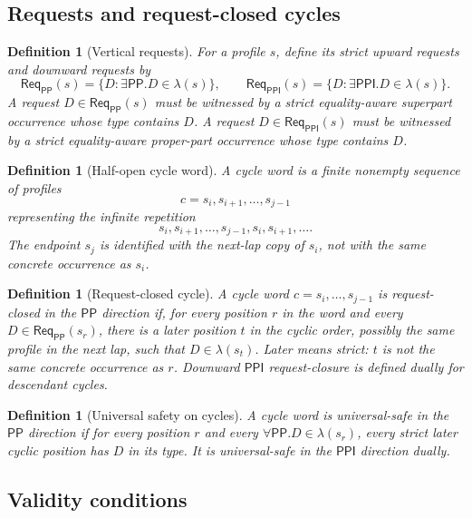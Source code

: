 \documentclass[11pt]{article}
\newtheorem{definition}[theorem]{Definition}
\newcommand{\PP}{\mathsf{PP}}
\newcommand{\PPI}{\mathsf{PPI}}
\newcommand{\Req}{\mathsf{Req}}
\begin{document}
\subsection{Requests and request-closed cycles}

\begin{definition}[Vertical requests]\label{def:requests}
For a profile $s$, define its strict upward requests and downward requests by
\[
  \Req_\PP(s)=\{D: \exists\PP.D\in\lambda(s)\},
  \qquad
  \Req_\PPI(s)=\{D: \exists\PPI.D\in\lambda(s)\}.
\]
A request $D\in\Req_\PP(s)$ must be witnessed by a strict equality-aware superpart occurrence whose type contains $D$.  A request $D\in\Req_\PPI(s)$ must be witnessed by a strict equality-aware proper-part occurrence whose type contains $D$.
\end{definition}

\begin{definition}[Half-open cycle word]\label{def:cycle-word}
A cycle word is a finite nonempty sequence of profiles
\[
   c=s_i,s_{i+1},\ldots,s_{j-1}
\]
representing the infinite repetition
\[
   s_i,s_{i+1},\ldots,s_{j-1},s_i,s_{i+1},\ldots.
\]
The endpoint $s_j$ is identified with the next-lap copy of $s_i$, not with the same concrete occurrence as $s_i$.
\end{definition}

\begin{definition}[Request-closed cycle]\label{def:request-closed-cycle}
A cycle word $c=s_i,\ldots,s_{j-1}$ is request-closed in the $\PP$ direction if, for every position $r$ in the word and every $D\in\Req_\PP(s_r)$, there is a later position $t$ in the cyclic order, possibly the same profile in the next lap, such that $D\in\lambda(s_t)$.  Later means strict: $t$ is not the same concrete occurrence as $r$.  Downward $\PPI$ request-closure is defined dually for descendant cycles.
\end{definition}

\begin{definition}[Universal safety on cycles]\label{def:cycle-safety}
A cycle word is universal-safe in the $\PP$ direction if for every position $r$ and every $\forall\PP.D\in\lambda(s_r)$, every strict later cyclic position has $D$ in its type.  It is universal-safe in the $\PPI$ direction dually.
\end{definition}

\subsection{Validity conditions}
\end{document}
